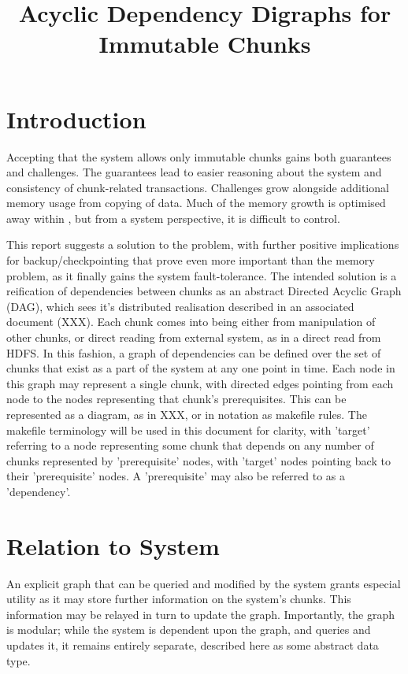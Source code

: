 \documentclass[10pt, a4paper]{article}
\begin{document}
\title{Acyclic Dependency Digraphs for Immutable Chunks}
  
\maketitle

\section{Introduction}
Accepting that the \lsr{} system allows only immutable chunks gains both guarantees and challenges.
The guarantees lead to easier reasoning about the system and consistency of chunk-related transactions.
Challenges grow alongside additional memory usage from copying of data.
Much of the memory growth is optimised away within \R{}, but from a system perspective, it is difficult to control.

This report suggests a solution to the problem, with further positive implications for backup/checkpointing that prove even more important than the memory problem, as it finally gains the system fault-tolerance.
The intended solution is a reification of dependencies between chunks as an abstract Directed Acyclic Graph (DAG), which sees it's distributed realisation described in an associated document (XXX).
Each chunk comes into being either from manipulation of other chunks, or direct reading from external system, as in a direct read from HDFS.
In this fashion, a graph of dependencies can be defined over the set of chunks that exist as a part of the system at any one point in time.
Each node in this graph may represent a single chunk, with directed edges pointing from each node to the nodes representing that chunk's prerequisites.
This can be represented as a diagram, as in XXX, or in notation as makefile rules.
The makefile terminology will be used in this document for clarity, with 'target' referring to a node representing some chunk that depends on any number of chunks represented by 'prerequisite' nodes, with 'target' nodes pointing back to their 'prerequisite' nodes.
A 'prerequisite' may also be referred to as a 'dependency'.

\section{Relation to System}

An explicit graph that can be queried and modified by the system grants especial utility as it may store further information on the system's chunks.
This information may be relayed in turn to update the graph.
Importantly, the graph is modular; while the system is dependent upon the graph, and queries and updates it, it remains entirely separate, described here as some abstract data type.
\end{document}

